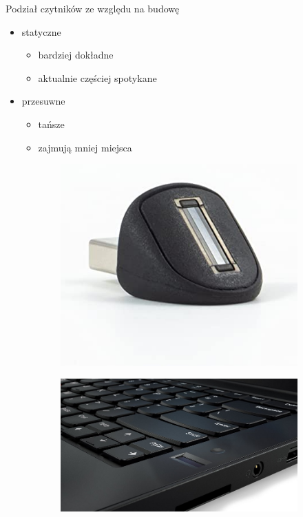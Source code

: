 \documentclass{beamer}
\begin{document}
\begin{frame}{Podział czytników ze względu na budowę}
    \begin{itemize}
        \item statyczne
            \begin{itemize}
            	\item bardziej dokładne
            	\item aktualnie częściej spotykane
        	\end{itemize}
        \item przesuwne
            \begin{itemize}
            	\item tańsze
            	\item zajmują mniej miejsca
        	\end{itemize}
    \end{itemize}
    \bigskip
    \begin{figure}
        \centering
        \begin{subfigure}{.49\textwidth}
            \centering
            \includegraphics[width=0.9\linewidth]{types/61yjiAyKfnL._AC_SY355_.jpg}
        \end{subfigure}
        \begin{subfigure}{.49\textwidth}
            \centering
            \includegraphics[width=0.8\linewidth]{types/Lenovo_ThinkPad_fingerprint_reader.jpg}
        \end{subfigure}
    \end{figure}
\end{frame}
\end{document}
